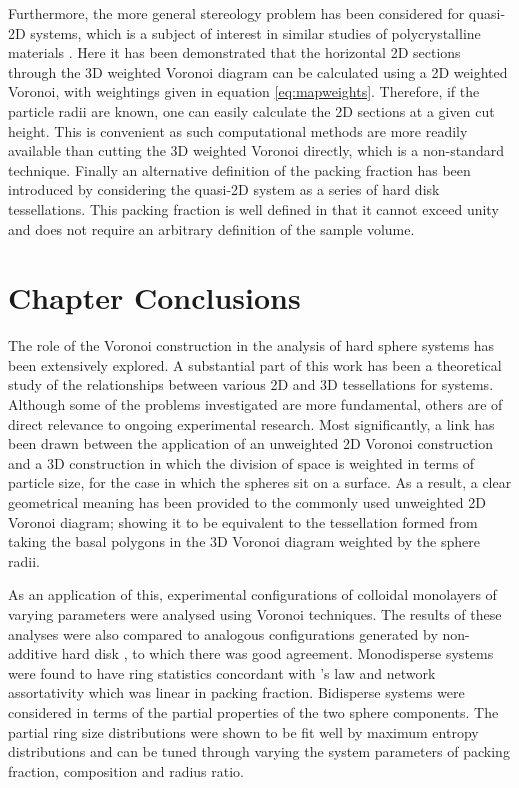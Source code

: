 Furthermore, the more general stereology problem has been considered for quasi\--2D systems, which is a subject of interest in similar studies of polycrystalline materials  \cite{Falco2017,Depriester2019}.
Here it has been demonstrated that the horizontal 2D sections through the 3D weighted Voronoi diagram can be calculated using a 2D weighted Voronoi, with weightings given in equation \eqref{eq:mapweights}.
Therefore, if the particle radii are known, one can easily calculate the 2D sections at a given cut height.
This is convenient as such computational methods are more readily available than cutting the 3D weighted Voronoi directly, which is a non\--standard technique.
Finally an alternative definition of the packing fraction has been introduced by considering the quasi\--2D system as a series of hard disk tessellations.
This packing fraction is well defined in that it cannot exceed unity and does not require an arbitrary definition of the sample volume.

\section{Chapter Conclusions}

The role of the Voronoi construction in the analysis of \qtd{} hard sphere systems has been extensively explored.
A substantial part of this work has been a theoretical study of the relationships between various 2D and 3D tessellations for \qtd{} systems.
Although some of the problems investigated are more fundamental, others are of direct relevance to ongoing experimental research.
Most significantly, a link has been drawn between the application of an unweighted 2D Voronoi construction and a 3D construction in which the division of space is weighted in terms of particle size, for the case in which the spheres sit on a surface.
As a result, a clear geometrical meaning has been provided to the commonly used unweighted 2D Voronoi diagram; showing it to be equivalent to the tessellation 
formed from taking the basal polygons in the 3D Voronoi diagram weighted by the sphere 
radii.

As an application of this, experimental configurations of \qtd{} colloidal monolayers of varying parameters were analysed using Voronoi techniques.
The results of these analyses were also compared to analogous configurations generated by non\--additive hard disk \mc{}, to which there was good agreement.
Monodisperse systems were found to have ring statistics concordant with \lm's law and network assortativity which was linear in packing fraction.
Bidisperse systems were considered in terms of the partial properties of the two sphere components.
The partial ring size distributions were shown to be fit well by maximum entropy distributions and can be tuned through varying the system parameters of packing fraction, composition and radius ratio.


